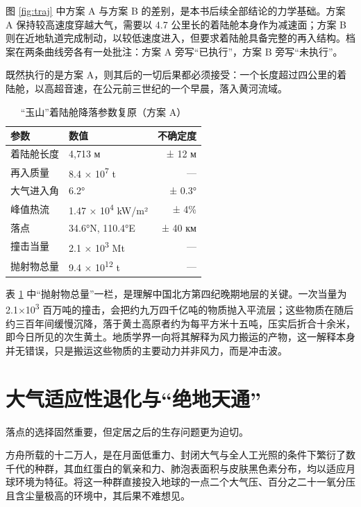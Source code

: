 图 \ref{fig:traj} 中方案 A 与方案 B 的差别，是本书后续全部结论的力学基础。方案 A 保持较高速度穿越大气，需要以 4.7 公里长的着陆舱本身作为减速面；方案 B 则在近地轨道完成制动，以较低速度进入，但要求着陆舱具备完整的再入结构。档案在两条曲线旁各有一处批注：方案 A 旁写“已执行”，方案 B 旁写“未执行”。

既然执行的是方案 A，则其后的一切后果都必须接受：一个长度超过四公里的着陆舱，以高超音速，在公元前三世纪的一个早晨，落入黄河流域。

\begin{table}[htbp]
\centering
\caption{“玉山”着陆舱降落参数复原（方案 A）}
\label{tab:landing}
\footnotesize
\begin{tabular}{@{}llr@{}}
\toprule
\textbf{参数} & \textbf{数值} & \textbf{不确定度}\\
\midrule
着陆舱长度 & 4{,}713 м & ± 12 м\\
再入质量 & 8.4 × 10\textsuperscript{7} t & —\\
大气进入角 & 6.2° & ± 0.3°\\
峰值热流 & 1.47 × 10\textsuperscript{4} kW/m² & ± 4\%\\
落点 & 34.6°N, 110.4°E & ± 40 км\\
撞击当量 & 2.1 × 10\textsuperscript{3} Mt & —\\
抛射物总量 & 9.4 × 10\textsuperscript{12} t & —\\
\bottomrule
\end{tabular}
\end{table}

表 \ref{tab:landing} 中“抛射物总量”一栏，是理解中国北方第四纪晚期地层的关键。一次当量为 2.1×10\textsuperscript{3} 百万吨的撞击，会把约九万四千亿吨的物质抛入平流层；这些物质在随后约三百年间缓慢沉降，落于黄土高原者约为每平方米十五吨，压实后折合十余米，即今日所见的次生黄土。地质学界一向将其解释为风力搬运的产物，这一解释本身并无错误，只是搬运这些物质的主要动力并非风力，而是冲击波。

\section{大气适应性退化与“绝地天通”}

落点的选择固然重要，但定居之后的生存问题更为迫切。

方舟所载的十二万人，是在月面低重力、封闭大气与全人工光照的条件下繁衍了数千代的种群，其血红蛋白的氧亲和力、肺泡表面积与皮肤黑色素分布，均以适应月球环境为特征。将这一种群直接投入地球的一点二个大气压、百分之二十一氧分压且含尘量极高的环境中，其后果不难想见。

